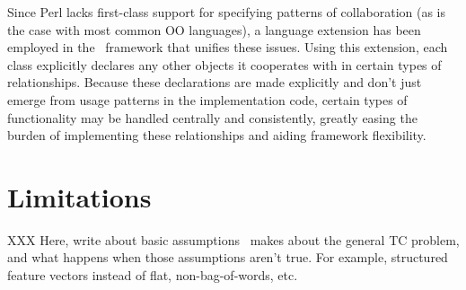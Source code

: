 Since Perl lacks first-class support for specifying patterns of
collaboration (as is the case with most common OO languages), a
language extension has been employed in the \aicat\ framework that
unifies these issues.  Using this extension, each class explicitly
declares any other objects it cooperates with in certain types of
relationships.  Because these declarations are made explicitly and
don't just emerge from usage patterns in the implementation code,
certain types of functionality may be handled centrally and
consistently, greatly easing the burden of implementing these
relationships and aiding framework flexibility.

\section{Limitations}

XXX Here, write about basic assumptions \aicat\ makes about the
general TC problem, and what happens when those assumptions aren't
true.  For example, structured feature vectors instead of flat,
non-bag-of-words, etc.

